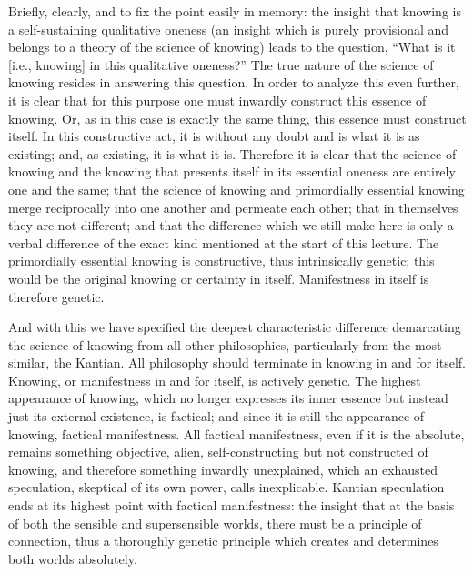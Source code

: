 Briefly, clearly, and to fix the point easily in memory:
the insight that knowing is a self-sustaining qualitative oneness
(an insight which is purely provisional and belongs to
a theory of the science of knowing) leads to the question,
“What is it [i.e., knowing] in this qualitative oneness?”
The true nature of the science of knowing resides in answering this question.
In order to analyze this even further, it is clear that
for this purpose one must inwardly construct this essence of knowing.
Or, as in this case is exactly the same thing,
this essence must construct itself.
In this constructive act, it is without any
doubt and is what it is as existing;
and, as existing, it is what it is.
Therefore it is clear that the science of knowing and
the knowing that presents itself in its essential oneness
are entirely one and the same;
that the science of knowing and primordially essential knowing
merge reciprocally into one another and permeate each other;
that in themselves they are not different;
and that the difference which we still make here is
only a verbal difference of the exact kind
mentioned at the start of this lecture.
The primordially essential knowing is constructive,
thus intrinsically genetic;
this would be the original knowing or certainty in itself.
Manifestness in itself is therefore genetic.

And with this we have specified the deepest characteristic difference
demarcating the science of knowing from all other philosophies,
particularly from the most similar, the Kantian.
All philosophy should terminate in knowing in and for itself.
Knowing, or manifestness in and for itself, is actively genetic.
The highest appearance of knowing, which no longer expresses its
inner essence but instead just its external existence, is factical;
and since it is still the appearance of knowing, factical manifestness.
All factical manifestness, even if it is the absolute, remains
something objective, alien, self-constructing but not constructed of knowing,
and therefore something inwardly unexplained, which an exhausted speculation,
skeptical of its own power, calls inexplicable.
Kantian speculation ends at its highest point with factical manifestness:
the insight that at the basis of both the sensible and supersensible worlds,
there must be a principle of connection, thus a thoroughly genetic principle
which creates and determines both worlds absolutely.

